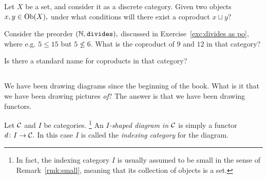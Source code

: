 \documentclass[CT4S-EN-RU]{subfiles}
\begin{document}
\begin{exerciseRUS}
\end{exerciseRUS}

\begin{exerciseENG}
Let $X$ be a set, and consider it as a discrete category. Given two objects $x,y\in\textnormal{Ob}(X),$ under what conditions will there exist a coproduct $x\sqcup y?$
\end{exerciseENG}

\begin{exerciseRUS}
\end{exerciseRUS}

\begin{exerciseENG}
Consider the preorder $({\mathbb N},{\tt divides}),$ discussed in Exercise~\ref{exc:divides as po}, where e.g. $5\leq 15$ but $5\not\leq 6.$ \sexc What is the coproduct of $9$ and $12$ in that category?
\item Is there a standard name for coproducts in that category?
\endsexc
\end{exerciseENG}

\begin{exerciseRUS}
\end{exerciseRUS}


\subsection{}\label{sec:diagrams in a category}

\begin{blockENG}
We have been drawing diagrams since the beginning of the book. What is it that we have been drawing pictures {\em of}? The answer is that we have been drawing functors.
\end{blockENG}

\begin{blockRUS}
\end{blockRUS}

\begin{definitionENG}
Let $\mathcal{C}$ and $I$ be categories.
\footnote{In fact, the indexing category $I$ is usually assumed to be small in the sense of Remark~\ref{rmk:small}, meaning that its collection of objects is a set.}
An {\em $I$-shaped diagram in $\mathcal{C}$} is simply a functor $d\colon I\rightarrow\mathcal{C}.$ In this case $I$ is called the {\em indexing category} for the diagram.
\end{definitionENG}
\end{document}
